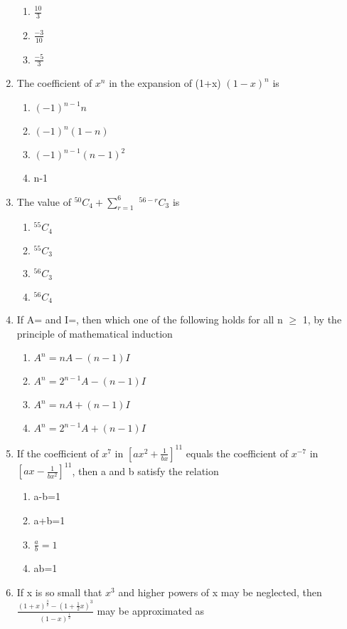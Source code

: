 \begin{enumerate}[label=\arabic*.,ref=\thesubsection.\theenumi]
\begin{enumerate}
    \item $\frac{10}{3}$
    \item $\frac{-3}{10}$
    \item $\frac{-5}{3}$
\end{enumerate}
\item The coefficient of $x^n$ in the expansion of (1+x) $(1-x)^n$ is
\begin{enumerate}
    \item $(-1)^{n-1} n$
    \item $(-1)^n(1-n)$
    \item $(-1)^{n-1}(n-1)^2$
    \item n-1
\end{enumerate}
\item The value of $^{50}C_4+\sum_{r=1}^6$ $^{56-r}C_3$ is
\begin{enumerate}
    \item $^{55}C_4$
    \item $^{55}C_3$
    \item $^{56}C_3$
    \item $^{56}C_4$
\end{enumerate}
\item If A= and I=, then which one of the following holds for all n $\geq$  1, by the principle of mathematical induction
\begin{enumerate}
    \item $A^n=nA-(n-1)I$
    \item $A^n=2^{n-1}A-(n-1)I$
    \item $A^n=nA+(n-1)I$
    \item $A^n=2^{n-1}A+(n-1)I$
\end{enumerate}
\item If the coefficient of $x^7$ in $[ax^2+\frac{1}{bx}]^{11}$ equals the coefficient of $x^{-7}$ in $[ax-\frac{1}{bx^2}]^{11}$, then a and b satisfy the relation
\begin{enumerate}
    \item a-b=1
    \item a+b=1
    \item $\frac{a}{b}=1$
    \item ab=1
\end{enumerate}
\item If x is so small that $x^3$ and higher powers of x may be neglected, then $\frac{(1+x)^\frac{3}{2}-(1+\frac{1}{2}x)^3}{(1-x)^\frac{1}{2}}$ may be approximated as 

\end{enumerate}
